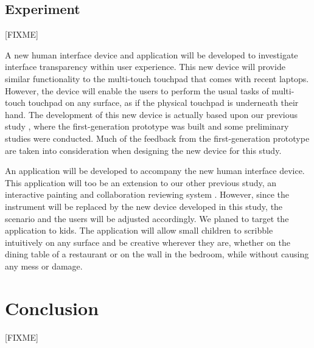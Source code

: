 \documentclass{acm_proc_article-sp}
\begin{document}
\subsection{Experiment}
[FIXME]

A new human interface device and application will be developed to
investigate interface transparency within user experience. This new
device will provide similar functionality to the multi-touch touchpad
that comes with recent laptops. However, the device will enable the
users to perform the usual tasks of multi-touch touchpad on any
surface, as if the physical touchpad is underneath their hand. The
development of this new device is actually based upon our previous
study \citep{lmnt:huang}, where the first-generation prototype was
built and some preliminary studies were conducted. Much of the
feedback from the first-generation prototype are taken into
consideration when designing the new device for this study.

An application will be developed to accompany the new human interface
device. This application will too be an extension to our other
previous study, an interactive painting and collaboration reviewing
system \citep{baba:abeyrathne}. However, since the instrument will be
replaced by the new device developed in this study, the scenario and
the users will be adjusted accordingly. We planed to target the
application to kids. The application will allow small children to
scribble intuitively on any surface and be creative wherever they are,
whether on the dining table of a restaurant or on the wall in the
bedroom, while without causing any mess or damage.



\section{Conclusion}
\label{sec:conclusion}
[FIXME]




\end{document}
